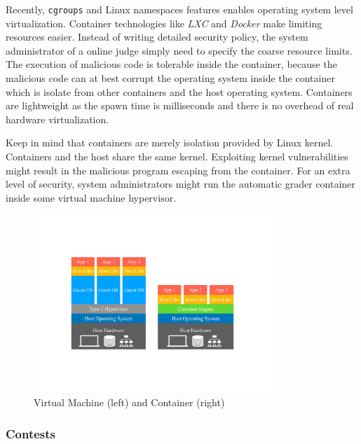             Recently, \texttt{cgroups} and Linux namespaces features enables operating system level virtualization.
            Container technologies like \emph{LXC} and \emph{Docker} make limiting resources easier.
            Instead of writing detailed security policy,
            the system administrator of a online judge simply need to specify the coarse resource limits.
            The execution of malicious code is tolerable inside the container,
            because the malicious code can at best corrupt the operating system inside the container
            which is isolate from other containers and the host operating system.
            Containers are lightweight as the spawn time is milliseconds and
            there is no overhead of real hardware virtualization.

            Keep in mind that containers are merely isolation provided by Linux kernel.
            Containers and the host share the same kernel.
            Exploiting kernel vulnerabilities might result in the malicious program escaping from the container.
            \cite{shapira_escape_2017}
            For an extra level of security,
            system administrators might run the automatic grader container inside some virtual machine hypervisor.

            \begin{figure}[htp]
                \centering
                \includegraphics[width=0.8\textwidth]{img/isolation.pdf}
                \caption{Virtual Machine (left) and Container (right)}
                \label{fig:isolation}
            \end{figure}

        \subsubsection{Contests}

